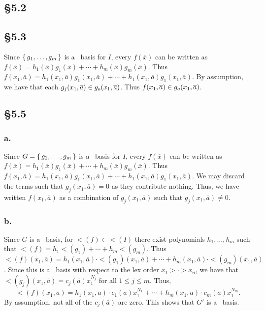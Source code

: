 \documentclass[letterpaper]{article}
\begin{document}
\subsection*{\S 5.2}


\subsection*{\S 5.3}

Since $\set{g_{1}, \ldots, g_{m}}$ is a \Grobner\ basis for $I$, every $f(\overline{x})$ can be written as $f(\overline{x}) = h_{1}(\overline{x})g_{1}(\overline{x}) + \cdots + h_{m}(\overline{x})g_{m}(\overline{x})$.
Thus $f(x_{1}, \overline{a}) = h_{1}(x_{1}, \overline{a})g_{1}(x_{1}, \overline{a}) + \cdots + h_{1}(x_{1}, \overline{a})g_{1}(x_{1}, \overline{a})$.
By assumption, we have that each $g_{j}(x_{1}, \overline{a}) \in \ideal{g_{o}(x_{1}, \overline{a})}$.
Thus $f(x_{1}, \overline{a}) \in \ideal{g_{o}(x_{1}, \overline{a})}$.

\subsection*{\S 5.5}

\subsubsection*{a.}

Since $G = \set{g_{1}, \ldots, g_{m}}$ is a \Grobner\ basis for $I$, every $f(\overline{x})$ can be written as $f(\overline{x}) = h_{1}(\overline{x})g_{1}(\overline{x}) + \cdots + h_{m}(\overline{x})g_{m}(\overline{x})$.
Thus $f(x_{1}, \overline{a}) = h_{1}(x_{1}, \overline{a})g_{1}(x_{1}, \overline{a}) + \cdots + h_{1}(x_{1}, \overline{a})g_{1}(x_{1}, \overline{a})$.
We may discard the terms such that $g_{j}(x_{1}, \overline{a}) = 0$ as they contribute nothing.
Thus, we have written $f(x_{1}, \overline{a})$ as a combination of $g_{j}(x_{1}, \overline{a})$ such that $g_{j}(x_{1}, \overline{a}) \neq 0$.

\subsubsection*{b.}

Since $G$ is a \Grobner\ basis, for $\lt(f) \in \lt(I)$ there exist polynomials $h_{1}, \ldots, h_{m}$ such that $\lt(f) = h_{1}\lt(g_{1}) + \cdots + h_{m}\lt(g_{m})$.
Thus $\lt(f)(x_{1}, \overline{a}) = h_{1}(x_{1}, \overline{a})\cdot\lt(g_{1})(x_{1}, \overline{a}) + \cdots + h_{m}(x_{1}, \overline{a})\cdot\lt(g_{m})(x_{1}, \overline{a})$.
Since this is a \Grobner\ basis with respect to the lex order $x_{1} > \cdot > x_{n}$, we have that $\lt(g_{j})(x_{1}, \overline{a}) = c_{j}(\overline{a}) x_{1}^{N_{j}}$ for all $1 \leq j \leq m$.
Thus,
\[
  \lt(f)(x_{1}, \overline{a}) = h_{1}(x_{1}, \overline{a})\cdot c_{1}(\overline{a}) x_{1}^{N_{1}} + \cdots + h_{m}(x_{1}, \overline{a})\cdot c_{m}(\overline{a}) x_{1}^{N_{m}}.
\]
By assumption, not all of the $c_{j}(\overline{a})$ are zero.
This shows that $G'$ is a \Grobner\ basis.
\end{document}
